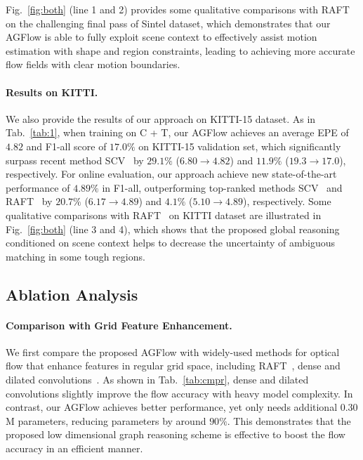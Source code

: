 \documentclass[letterpaper]{article} %
\begin{document}
Fig.~\ref{fig:both} (line 1 and 2) provides some qualitative comparisons with RAFT~\cite{Teed2020RAFTRA} on the challenging final pass of Sintel dataset, which demonstrates that our AGFlow is able to fully exploit scene context to effectively assist motion estimation with shape and region constraints, leading to achieving more accurate flow fields with clear motion boundaries.

\paragraph{Results on KITTI.}

We also provide the results of our approach on KITTI-15 dataset. As in Tab.~\ref{tab:1}, when training on C + T, our AGFlow achieves an average EPE of $4.82$ and F1-all score of $17.0\% $ on KITTI-15 validation set, which significantly surpass recent method SCV~\cite{Jiang2021LearningOF} by $29.1\%$ ($6.80 \rightarrow 4.82$) and $11.9\%$ ($19.3 \rightarrow 17.0$), respectively. For online evaluation, our approach achieve new state-of-the-art performance of $4.89\%$ in F1-all, outperforming top-ranked methods SCV~\cite{Jiang2021LearningOF} and RAFT~\cite{Teed2020RAFTRA} by $20.7\%$ ($6.17\rightarrow 4.89$) and $4.1\%$ ($5.10 \rightarrow 4.89$), respectively. Some qualitative comparisons with RAFT~\cite{Teed2020RAFTRA} on KITTI dataset are illustrated in Fig.~\ref{fig:both} (line 3 and 4), which shows that the proposed global reasoning conditioned on scene context helps to decrease the uncertainty of ambiguous matching in some tough regions.

\subsection{Ablation Analysis} \label{sec:4}

\paragraph{Comparison with Grid Feature Enhancement.}
We first compare the proposed AGFlow with widely-used methods for optical flow that enhance features in regular grid space, including RAFT~\cite{Teed2020RAFTRA}, dense and dilated convolutions~\cite{Sun2018PWCNetCF, Hur2019IterativeRR}. As shown in Tab.~\ref{tab:cmpr}, dense and dilated convolutions slightly improve the flow accuracy with heavy model complexity. In contrast, our AGFlow achieves better performance, yet only needs additional $0.30$ M parameters, reducing parameters by around $90\%$. This demonstrates that the proposed low dimensional graph reasoning scheme is effective to boost the flow accuracy in an efficient manner.
\end{document}
